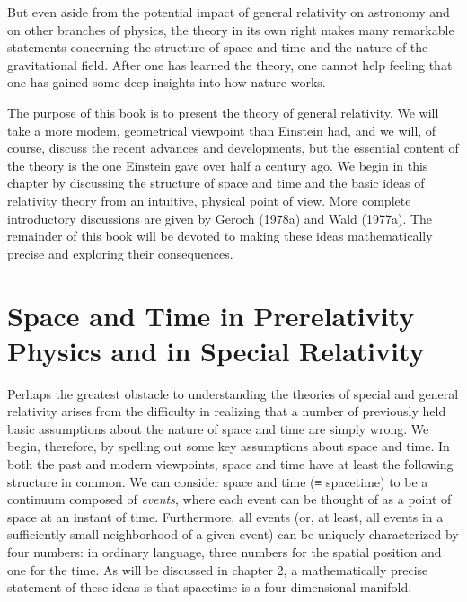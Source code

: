 But even aside from the potential impact of general relativity on astronomy and on other branches of physics, the theory in its own right makes many remarkable statements concerning the structure of space and time and the nature of the gravitational field. After one has learned the theory, one cannot help feeling that one has gained some deep insights into how nature works.

The purpose of this book is to present the theory of general relativity. We will take a more modem, geometrical viewpoint than Einstein had, and we will, of course, discuss the recent advances and developments, but the essential content of the theory is the one Einstein gave over half a century ago. We begin in this chapter by discussing the structure of space and time and the basic ideas of relativity theory from an intuitive, physical point of view. More complete introductory discussions are given by Geroch (1978a) and Wald (1977a). The remainder of this book will be devoted to making these ideas mathematically precise and exploring their consequences.

\section{Space and Time in Prerelativity Physics and in Special Relativity}

Perhaps the greatest obstacle to understanding the theories of special and general relativity arises from the difficulty in realizing that a number of previously held basic assumptions about the nature of space and time are simply wrong. We begin, therefore, by spelling out some key assumptions about space and time. In both the past and modern viewpoints, space and time have at least the following structure in common. We can consider space and time (≡ spacetime) to be a continuum composed of \emph{events}, where each event can be thought of as a point of space at an instant of time. Furthermore, all events (or, at least, all events in a sufficiently small neighborhood of a given event) can be uniquely characterized by four numbers: in ordinary language, three numbers for the spatial position and one for the time. As will be discussed in chapter 2, a mathematically precise statement of these ideas is that spacetime is a four-dimensional manifold.

